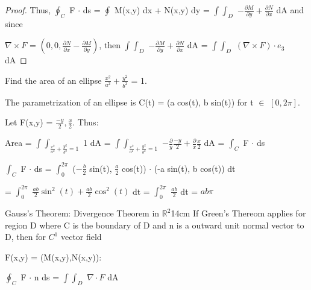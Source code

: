 \begin{proof}
        \vspace{0.3cm}

        Thus, $\oint_C$ F $\cdot$ ds
        = $\oint$ M(x,y) dx + N(x,y) dy
        = $\int \int_D$ $-\frac{\partial M}{\partial y}
                        + \frac{\partial N}{\partial x}$ dA
        and since
        
        $\nabla \times F$
        = $(0,0,\frac{\partial N}{\partial x}-\frac{\partial M}{\partial y})$,
        then
        $\int \int_D$ $-\frac{\partial M}{\partial y}
                        + \frac{\partial N}{\partial x}$ dA
        = $\int \int_D$ $(\nabla \times F) \cdot e_3$ dA
    \end{proof}

    \vspace{0.5cm}



    \begin{example}
        Find the area of an ellipse $\frac{x^2}{a^2} + \frac{y^2}{b^2}$ = 1.
    \end{example}

    \begin{tbox}
        The parametrization of an ellipse is C(t) = (a cos(t), b sin(t))
        for t $\in$ $[0,2\pi]$.

        Let F(x,y) = $\frac{-y}{2},\frac{x}{2}$. Thus:

        \hspace{0.5cm}
        Area
        = $\int \int_{\frac{x^2}{a^2} + \frac{y^2}{b^2} = 1}$ 1 dA
        = $\int \int_{\frac{x^2}{a^2} + \frac{y^2}{b^2} = 1}$
            $-\frac{\partial}{y}\frac{-y}{2} + \frac{\partial}{x}\frac{x}{2}$ dA
        = $\int_{C}$ F $\cdot$ ds

        \hspace{0.5cm}
        $\int_{C}$ F $\cdot$ ds
        = $\int_0^{2\pi}$
            ($-\frac{b}{2}$ sin(t), $\frac{a}{2}$ cos(t))
            $\cdot$ (-a sin(t), b cos(t)) dt

        \hspace{2.3cm}
        = $\int_0^{2\pi}$ $\frac{ab}{2}\sin^2(t) + \frac{ab}{2} \cos^2(t)$ dt
        = $\int_0^{2\pi}$ $\frac{ab}{2}$ dt
        = $ab \pi$
    \end{tbox}

    \newpage



    \begin{wtheorem}{Gauss's Theorem: Divergence Theorem in $\mathbb{R}^2$}{14cm}
        If Green's Thereom applies for region D where C is the boundary of D
        and n is a outward unit normal vector to D, then for $C^1$ vector field
        
        F(x,y) = (M(x,y),N(x,y)):

        \hspace{0.5cm}
        $\oint_C$ F $\cdot$ n ds
        = $\int \int_D$ $\nabla \cdot F$ dA
    \end{wtheorem}

